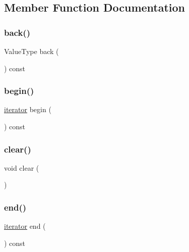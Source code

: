 \subsection{Member Function Documentation}
\mbox{\label{classSparseGrid_a38cbd80c93f450dc9bf3ca7c6a6220bd}} 
\subsubsection{\texorpdfstring{back()}{back()}}
{\footnotesize\ttfamily Value\+Type back (\begin{DoxyParamCaption}{ }\end{DoxyParamCaption}) const}

\mbox{\label{classSparseGrid_a0c62c15c8ed609e7e5e9518cf5f5c712}} 
\subsubsection{\texorpdfstring{begin()}{begin()}}
{\footnotesize\ttfamily \mbox{\hyperlink{classSparseGrid_1_1iterator}{iterator}} begin (\begin{DoxyParamCaption}{ }\end{DoxyParamCaption}) const\hspace{0.3cm}{\ttfamily [inline]}}

\mbox{\label{classSparseGrid_ac8bb3912a3ce86b15842e79d0b421204}} 
\subsubsection{\texorpdfstring{clear()}{clear()}}
{\footnotesize\ttfamily void clear (\begin{DoxyParamCaption}{ }\end{DoxyParamCaption})}

\mbox{\label{classSparseGrid_a68b688a51bd0cf6fb5bc2cba292209a8}} 
\subsubsection{\texorpdfstring{end()}{end()}}
{\footnotesize\ttfamily \mbox{\hyperlink{classSparseGrid_1_1iterator}{iterator}} end (\begin{DoxyParamCaption}{ }\end{DoxyParamCaption}) const\hspace{0.3cm}{\ttfamily [inline]}}

